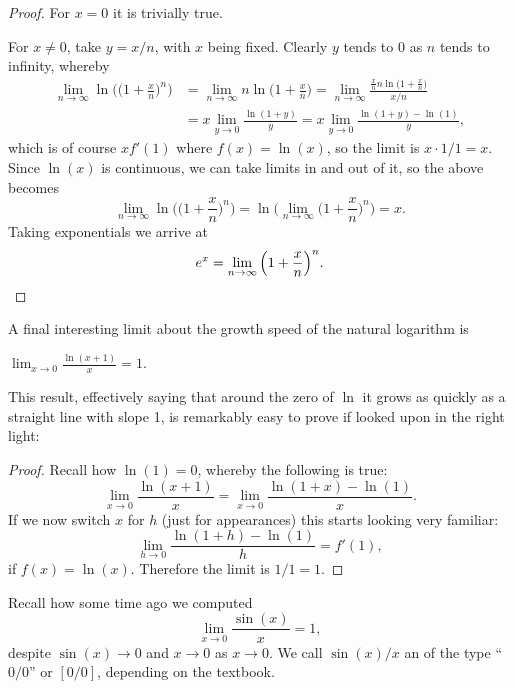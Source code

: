 \begin{proof}
	For $x = 0$ it is trivially true.

	For $x \neq 0$, take $y = x / n$, with $x$ being fixed.
	Clearly $y$ tends to $0$ as $n$ tends to infinity, whereby
	\begin{align*}
		\lim_{n \to \infty} \ln \Big ( \Big ( 1 + \frac{x}{n} \Big )^n \Big ) & = \lim_{n \to \infty} n \ln\Big ( 1 + \frac{x}{n} \Big ) = \lim_{n \to \infty} \frac{\frac{x}{n} n \ln \big ( 1 + \frac{x}{n} \big )}{x / n} \\
    & = x \lim_{y \to 0} \frac{\ln(1 + y)}{y} = x \lim_{y \to 0} \frac{\ln(1 + y) - \ln(1)}{y},
	\end{align*}
	which is of course $x f'(1)$ where $f(x) = \ln(x)$, so the limit is $x \cdot 1/1 = x$.
	Since $\ln(x)$ is continuous, we can take limits in and out of it, so the above becomes
	\[
		\lim_{n \to \infty} \ln \Big ( \Big ( 1 + \frac{x}{n} \Big )^n \Big ) = \ln \Big ( \lim_{n \to \infty} \Big ( 1 + \frac{x}{n} \Big )^n \Big ) = x.
	\]
	Taking exponentials we arrive at
	\[
		e^x = \lim_{n \to \infty} \Big ( 1 + \frac{x}{n} \Big )^n. \qedhere
	\]
\end{proof}

\noindent
A final interesting limit about the growth speed of the natural logarithm is
\begin{proposition}
	$\displaystyle \lim_{x \to 0} \frac{\ln(x + 1)}{x} = 1$.
\end{proposition}

\noindent
This result, effectively saying that around the zero of $\ln$ it grows as quickly as a straight line with slope 1, is remarkably easy to prove if looked upon in the right light:

\begin{proof}
	Recall how $\ln(1) = 0$, whereby the following is true:
	\[
		\lim_{x \to 0} \frac{\ln(x + 1)}{x} = \lim_{x \to 0} \frac{\ln(1 + x) - \ln(1)}{x}.
	\]
	If we now switch $x$ for $h$ (just for appearances) this starts looking very familiar:
	\[
		\lim_{h \to 0} \frac{\ln(1 + h) - \ln(1)}{h} = f'(1),
	\]
	if $f(x) = \ln(x)$. Therefore the limit is $1/1 = 1$.
\end{proof}


Recall how some time ago we computed
\[
	\lim_{x \to 0} \frac{\sin(x)}{x} = 1,
\]
despite $\sin(x) \to 0$ and $x \to 0$ as $x \to 0$.
We call $\sin(x) / x$ an  of the type ``$0 / 0$'' or $[0 / 0]$, depending on the textbook.

